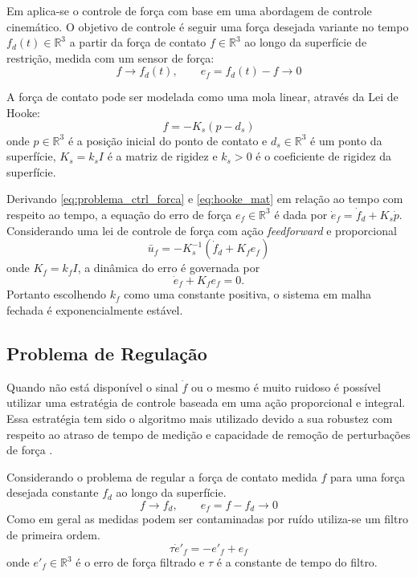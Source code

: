 Em \citep{leite2011servo} aplica-se o controle de força com base em uma abordagem de controle cinemático. O objetivo de controle é seguir uma força desejada variante no tempo ${f}_d(t) \in \mathbb{R}^3$ a partir da força de contato ${f} \in \mathbb{R}^3$ ao longo da superfície de restrição, medida com um sensor de força:
\begin{equation} \label{eq:problema_ctrl_forca}
{f} \rightarrow {f}_d(t), \qquad {e}_f = {f}_d(t) - {f} \rightarrow 0
\end{equation}

A força de contato pode ser modelada como uma mola linear, através da Lei de Hooke:
\begin{equation} \label{eq:hooke_mat}
{f} = -{K}_s ({p} - {d}_s)
\end{equation}
onde ${p} \in \mathbb{R}^3$ é a posição inicial do ponto de contato e ${d}_s \in \mathbb{R}^3$ é um ponto da superfície, ${K}_s = k_s I$ é a matriz de rigidez e $k_s > 0$ é o coeficiente de rigidez da superfície.

Derivando \eqref{eq:problema_ctrl_forca} e \eqref{eq:hooke_mat} em relação ao tempo com respeito ao tempo, a equação do erro de força $e_f \in \mathbb{R}^3$ é dada por $\dot{{e}}_f = \dot{{f}}_d + {K}_s \dot{{p}}$. Considerando uma lei de controle de força com ação \textit{feedforward} e proporcional
\begin{equation}
{\bar{u}}_f = -{K}_s^{-1} (\dot{{f}}_d + {K}_f {e}_f)
\end{equation}
onde ${K}_f = k_f {I}$, a dinâmica do erro é governada por
\begin{equation}
\dot{{e}}_f + {K}_f {e}_f = 0.
\end{equation}
Portanto escolhendo $k_f$ como uma constante positiva, o sistema em malha fechada é exponencialmente estável. 

\subsection{Problema de Regulação}
Quando não está disponível o sinal $\dot{f}$ ou o mesmo é muito ruidoso é possível utilizar uma 
estratégia de controle baseada em uma ação proporcional e integral. Essa estratégia tem sido o algoritmo mais utilizado devido a sua robustez com respeito ao atraso de tempo de medição e capacidade de remoção de perturbações de força \citep{wilfinger1994integral}.

Considerando o problema de regular a força de contato medida $f$ para uma força desejada constante $f_d$ ao longo da superfície. 
\begin{equation} \label{eq:ef_reg}
f \rightarrow f_d, \qquad e_f = f - f_d \to 0
\end{equation}
Como em geral as medidas podem ser contaminadas por ruído utiliza-se um filtro de primeira ordem.
\begin{equation} \label{eq:efilter_reg}
\tau \dot{e}'_{f} = -e'_{f} + e_f 
\end{equation}
onde $e'_{f} \in \mathbb{R}^3$ é o erro de força filtrado e $\tau$ é a constante de tempo do filtro. 

